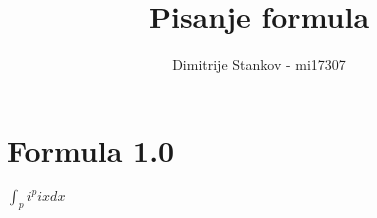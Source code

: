 \documentclass {article}
\author {Dimitrije Stankov - mi17307}
\title {Pisanje formula}
\begin{document}
\section {Formula 1.0}
$\int_pi^pixdx$
\end{document}
